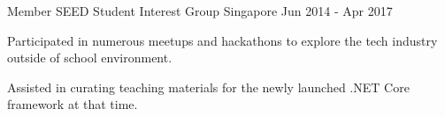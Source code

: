 

\begin{cventries}


  \cventry
    {Member} %
    {SEED Student Interest Group} %
    {Singapore} %
    {Jun 2014 - Apr 2017} %
    {
      \begin{cvitems} %
        \item {Participated in numerous meetups and hackathons to explore the tech industry outside of school environment.}
        \item {Assisted in curating teaching materials for the newly launched .NET Core framework at that time.}
      \end{cvitems}
    }

\end{cventries}

